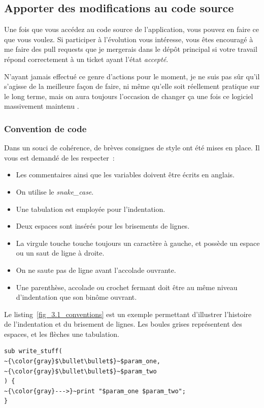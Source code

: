 \subsection{Apporter des modifications au code source}

Une fois que vous accédez au code source de l'application, vous pouvez en faire ce que vous voulez.
Si participer à l'évolution vous intéresse, vous êtes encouragé à me faire des pull requests que je mergerais dans le dépôt principal si votre travail répond correctement à un ticket ayant l'état \emph{accepté}.

N'ayant jamais effectué ce genre d'actions pour le moment, je ne suis pas sûr qu'il s'agisse de la meilleure façon de faire, ni même qu'elle soit réellement pratique sur le long terme, mais on aura toujours l'occasion de changer ça une fois ce logiciel massivement maintenu \Winkey.

\subsubsection{Convention de code}
Dans un souci de cohérence, de brèves consignes de style ont été mises en place. Il vous est demandé de les respecter~:
\begin{itemize}
	\item Les commentaires ainsi que les variables doivent être écrits en anglais.
	\item On utilise le \emph{snake\_case}.
	\item Une tabulation est employée pour l'indentation.
	\item Deux espaces sont insérés pour les brisements de lignes.
	\item La virgule touche touche toujours un caractère à gauche, et possède un espace ou un saut de ligne à droite.
	\item On ne saute pas de ligne avant l'accolade ouvrante.
	\item Une parenthèse, accolade ou crochet fermant doit être au même niveau d'indentation que son binôme ouvrant.
\end{itemize}

Le listing~\ref{fig_3.1_conventions} est un exemple permettant d'illustrer l'histoire de l'indentation et du brisement de lignes.
Les boules grises représentent des espaces, et les flèches une tabulation.

\begin{lstlisting}[basicstyle=\normalsize, caption={Conventions de code}, label=fig_3.1_conventions]
sub write_stuff(
~{\color{gray}$\bullet\bullet$}~$param_one,
~{\color{gray}$\bullet\bullet$}~$param_two
) {
~{\color{gray}--->}~print "$param_one $param_two";
}
\end{lstlisting}

